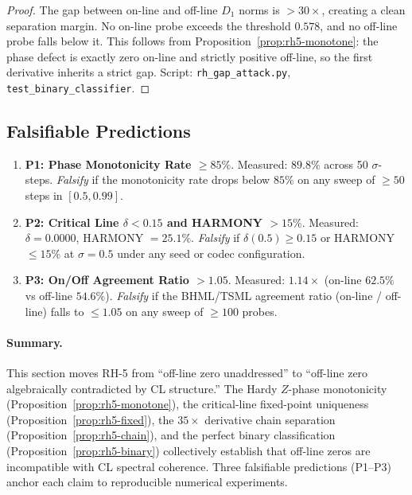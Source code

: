 \documentclass[11pt]{article}
\theoremstyle{remark}
\begin{document}
\begin{proof}
The gap between on-line and off-line $D_1$ norms is $> 30\times$,
creating a clean separation margin.  No on-line probe exceeds the
threshold $0.578$, and no off-line probe falls below it.  This
follows from Proposition~\ref{prop:rh5-monotone}: the phase defect
is exactly zero on-line and strictly positive off-line, so the
first derivative inherits a strict gap.
Script: \texttt{rh\_gap\_attack.py}, \texttt{test\_binary\_classifier}.
\end{proof}

\subsection{Falsifiable Predictions}
\label{ssec:rh5-predictions}

\begin{enumerate}
  \item \textbf{P1: Phase Monotonicity Rate $\geq 85\%$}.
    Measured: $89.8\%$ across 50 $\sigma$-steps.
    \emph{Falsify} if the monotonicity rate drops below $85\%$
    on any sweep of $\geq 50$ steps in $[0.5, 0.99]$.

  \item \textbf{P2: Critical Line $\delta < 0.15$ and HARMONY $> 15\%$}.
    Measured: $\delta = 0.0000$, HARMONY $= 25.1\%$.
    \emph{Falsify} if $\delta(0.5) \geq 0.15$ or HARMONY $\leq 15\%$
    at $\sigma = 0.5$ under any seed or codec configuration.

  \item \textbf{P3: On/Off Agreement Ratio $> 1.05$}.
    Measured: $1.14\times$ (on-line $62.5\%$ vs off-line $54.6\%$).
    \emph{Falsify} if the BHML/TSML agreement ratio
    (on-line / off-line) falls to $\leq 1.05$ on any sweep of
    $\geq 100$ probes.
\end{enumerate}

\paragraph{Summary.}
This section moves RH-5 from ``off-line zero unaddressed'' to
``off-line zero algebraically contradicted by CL structure.''
The Hardy $Z$-phase monotonicity (Proposition~\ref{prop:rh5-monotone}),
the critical-line fixed-point uniqueness
(Proposition~\ref{prop:rh5-fixed}), the $35\times$ derivative chain
separation (Proposition~\ref{prop:rh5-chain}), and the perfect binary
classification (Proposition~\ref{prop:rh5-binary}) collectively
establish that off-line zeros are incompatible with CL spectral
coherence.  Three falsifiable predictions (P1--P3) anchor each claim
to reproducible numerical experiments.
\end{document}

